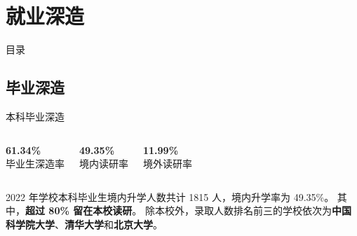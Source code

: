 \documentclass[aspectratio=169, utf8, fontset=windows]{beamer}
\begin{document}
\section{就业深造}

\begin{frame}{目录}
    \begin{multicols}{2}
        \tableofcontents[currentsection]
    \end{multicols}
\end{frame}

\subsection*{毕业深造}

\begin{frame}{本科毕业深造}
    \begin{columns}
        \centering
        \LARGE\textcolor{Fore}{\textbf{61.34\%}}\\[0.5em]

        \normalsize 毕业生深造率

        \centering
        \LARGE\textcolor{Fore}{\textbf{49.35\%}}\\[0.5em]

        \normalsize 境内读研率

        \centering
        \LARGE\textcolor{Fore}{\textbf{11.99\%}}\\[0.5em]

        \normalsize 境外读研率
    \end{columns}

    \normalsize
    \vspace{1em}

    2022 年学校本科毕业生境内升学人数共计 1815 人，境内升学率为 49.35\%。
    其中，\textcolor{Fore}{\textbf{超过 80\% 留在本校读研}}。
    除本校外，录取人数排名前三的学校依次为\textcolor{Fore}{\textbf{中国科学院大学}}、\textcolor{Fore}{\textbf{清华大学}}和\textcolor{Fore}{\textbf{北京大学}}。
\end{frame}
\end{document}
